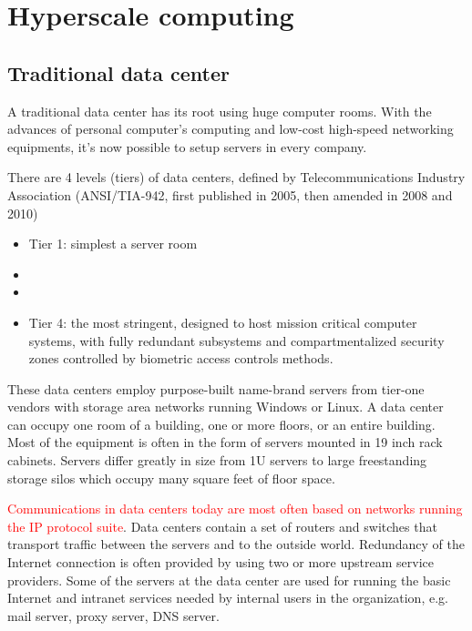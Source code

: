 \chapter{Hyperscale computing}
\label{chap:hyperscale_computing}


\section{Traditional data center} 
\label{sec:traditional-datacenter}

A traditional data center has its root using huge computer rooms. With the
advances of personal computer's computing and low-cost high-speed networking
equipments, it's now possible to setup servers in every company. 

There are 4 levels (tiers) of data centers, defined by  Telecommunications
Industry Association (ANSI/TIA-942, first published in 2005, then amended in
2008 and 2010)
\begin{itemize}
  \item Tier 1: simplest a server room
  \item 
  \item 
  \item Tier 4: the most stringent, designed to host mission critical computer
  systems, with fully redundant subsystems and compartmentalized security zones
  controlled by biometric access controls methods.
\end{itemize}

These data centers employ purpose-built name-brand servers from tier-one vendors
with storage area networks  running Windows or Linux. A data center can occupy
one room of a building, one or more floors, or an entire building. Most of the
equipment is often in the form of servers mounted in 19 inch rack cabinets. 
Servers differ greatly in size from 1U servers to large freestanding storage
silos which occupy many square feet of floor space. 

\textcolor{red}{Communications in data centers today are most often based on
networks running the IP protocol suite}. Data centers contain a set of routers
and switches that transport traffic between the servers and to the outside
world. Redundancy of the Internet connection is often provided by using two or
more upstream service providers. Some of the servers at the data center are used
for running the basic Internet and intranet services needed by internal users in
the organization, e.g. mail server, proxy server, DNS server.

